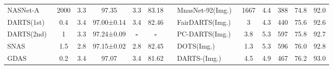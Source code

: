 \documentclass[10pt,twocolumn,letterpaper]{article}
\begin{document}
\begin{table*}[t]
\begin{center}
{\begin{tabular}{lcccccllccccc}
NASNet-A~\cite{nasnet}                & 2000                                                                  & 3.3          & 97.35         & 3.3           & 83.18         &  & MnasNet-92(Img.)~\cite{mnasnet}                    & 1667                                                                  & 4.4                                                                   & 388                                                                  & 74.8                                                                 & 92.0                                                                 \\
DARTS(1st)~\cite{darts}              & 0.4                                                                   & 3.4          & 97.00±0.14    & 3.4           & 82.46         &  & FairDARTS(Img.)~\cite{fairdarts}                     & 3                                                                     & 4.3                                                                   & 440                                                                  & 75.6                                                                 & 92.6                                                                 \\
DARTS(2nd)~\cite{darts}              & 1                                                                     & 3.3          & 97.24±0.09    & \textbf{-}    & \textbf{-}    &  & PC-DARTS(Img.)~\cite{pc-darts}                      & 3.8                                                                   & 5.3                                                                   & 597                                                                  & 75.8                                                                 & 92.7                                                                 \\
SNAS~\cite{snas}                    & 1.5                                                                   & 2.8          & 97.15±0.02    & 2.8           & 82.45         &  & DOTS(Img.)~\cite{dots}                          & 1.3                                                                   & 5.3                                                                   & 596                                                                  & 76.0                                                                 & 92.8                                                                 \\
GDAS~\cite{GDAS}                    & 0.2                                                                   & 3.4          & 97.07         & 3.4           & 81.62         &  & DARTS-(Img.)~\cite{darts-}                        & 4.5                                                                   & 4.9                                                                   & 467                                                                  & 76.2                                                                 & 93.0                                                                 \\ \cline{8-13} 

\end{tabular}}
\end{center}
\end{table*}
\end{document}
